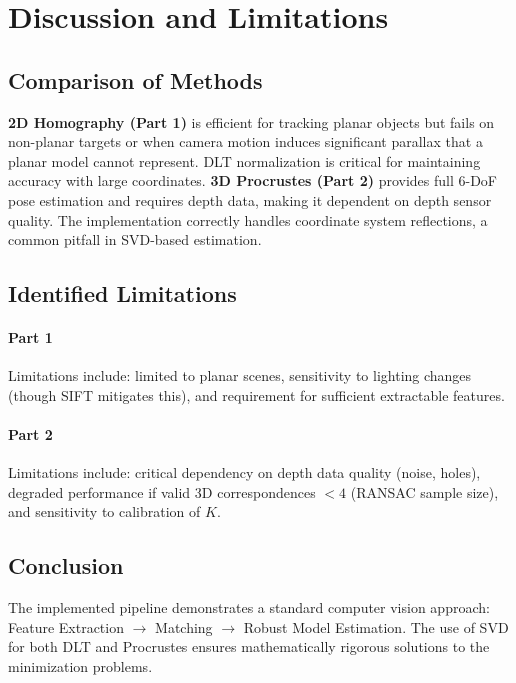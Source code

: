 \documentclass[10pt,twocolumn]{extarticle}
\begin{document}
\section{Discussion and Limitations}

\subsection{Comparison of Methods}
\textbf{2D Homography (Part 1)} is efficient for tracking planar objects but fails on non-planar targets or when camera motion induces significant parallax that a planar model cannot represent. DLT normalization is critical for maintaining accuracy with large coordinates. \textbf{3D Procrustes (Part 2)} provides full 6-DoF pose estimation and requires depth data, making it dependent on depth sensor quality. The implementation correctly handles coordinate system reflections, a common pitfall in SVD-based estimation.

\subsection{Identified Limitations}

\paragraph{Part 1}
Limitations include: limited to planar scenes, sensitivity to lighting changes (though SIFT mitigates this), and requirement for sufficient extractable features.

\paragraph{Part 2}
Limitations include: critical dependency on depth data quality (noise, holes), degraded performance if valid 3D correspondences $< 4$ (RANSAC sample size), and sensitivity to calibration of $K$.

\subsection{Conclusion}
The implemented pipeline demonstrates a standard computer vision approach: Feature Extraction $\rightarrow$ Matching $\rightarrow$ Robust Model Estimation. The use of SVD for both DLT and Procrustes ensures mathematically rigorous solutions to the minimization problems.
\end{document}
